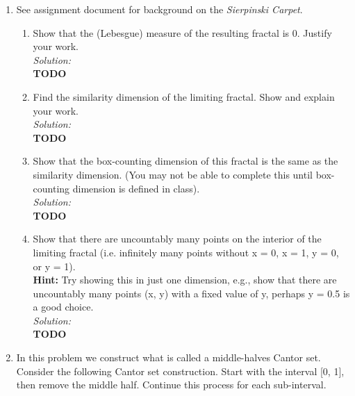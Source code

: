 \documentclass[10pt]{amsart}
\theoremstyle{nonumberplain}
\begin{document}
\begin{enumerate}[label={\bf {\arabic*}:}]
\item See assignment document for background on the \textit{Sierpinski Carpet}.
\begin{enumerate}

\item Show that the (Lebesgue) measure of the resulting fractal is 0.
Justify your work. \\

\textit{Solution:} \\
\textbf{TODO} \\

\item Find the similarity dimension of the limiting fractal. Show and explain your work. \\

\textit{Solution:} \\
\textbf{TODO} \\

\item Show that the box-counting dimension of this fractal is the same as the similarity dimension. (You may not be able to complete this until box-counting dimension is defined in class). \\

\textit{Solution:} \\
\textbf{TODO} \\

\item Show that there are uncountably many points on the interior of the limiting fractal (i.e. infinitely many points without x = 0, x = 1, y = 0, or y = 1). \\
\textbf{Hint:} Try showing this in just one dimension, e.g., show that there are uncountably many points (x, y) with a fixed value of y, perhaps y = 0.5 is a good choice. \\

\textit{Solution:} \\
\textbf{TODO} \\

\newpage

\end{enumerate}

\item In this problem we construct what is called a middle-halves Cantor set.
Consider the following Cantor set construction. Start with the interval [0, 1], then remove the middle half. Continue this process for each sub-interval. \\
\begin{enumerate}


\end{enumerate}
\end{enumerate}
\end{document}
